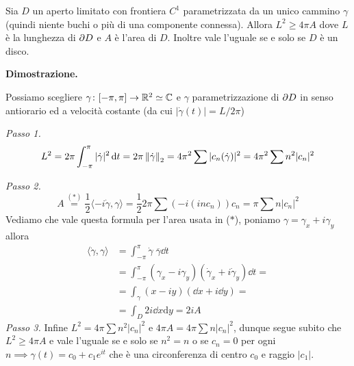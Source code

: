 Sia $D$ un aperto limitato con frontiera $C^1$ parametrizzata da un unico cammino $\gamma$ (quindi niente buchi o più di una componente connessa). Allora $L^2 \geq 4 \pi A$ dove $L$ è la lunghezza di $\partial D$ e $A$ è l'area di $D$. Inoltre vale l'uguale se e solo se $D$ è un disco.

\textbf{Dimostrazione.}

Possiamo scegliere $\gamma \colon [-\pi, \pi] \to \mathbb R^2 \simeq \mathbb C$ e $\gamma$ parametrizzazione di $\partial D$ in senso antiorario ed a velocità costante (da cui $|\dot\gamma(t)| = L / 2\pi$)

\textit{Passo 1.}
$$
L^2 = 2\pi \int_{-\pi}^\pi |\dot \gamma|^2 \,\mathrm{d} t = 2\pi \left\lVert \dot \gamma \right\rVert_2 = 4 \pi^2 \sum |c_n(\dot \gamma)|^2 = 4 \pi^2 \sum n^2 |c_n|^2
$$

\textit{Passo 2.}
$$
A \overset{(*)}{=} \frac{1}{2}\langle -i\dot\gamma, \gamma \rangle = \frac{1}{2} 2\pi \sum (-i (inc_n))c_n = \pi \sum n |c_n|^2
$$
Vediamo che vale questa formula per l'area usata in ($*$), poniamo $\gamma = \gamma_x + i \gamma_y$ allora
$$
\begin{aligned}
	\langle \dot\gamma, \gamma \rangle 
	&= \int_{-\pi}^\pi \dot\gamma \; \overline\gamma \dd t \\
	&= \int_{-\pi}^\pi (\gamma_x - i \gamma_y) (\dot\gamma_x + i \dot\gamma_y) \dd t = \\
	&= \int_\gamma (x - iy) (\dd x + i \dd y) = \\
	&= \int_D 2i \dd x \mathrm d y = 2i A
\end{aligned}
$$
\textit{Passo 3.}
Infine $L^2 = 4 \pi \sum n^2 |c_n|^2$ e $4\pi A = 4\pi \sum n |c_n|^2$, dunque segue subito che $L^2 \geq 4 \pi A$ e vale l'uguale se e solo se $n^2 = n$ o se $c_n = 0$ per ogni $n \implies \gamma(t) = c_0 + c_1 e^{it}$ che è una circonferenza di centro $c_0$ e raggio $|c_1|$.




